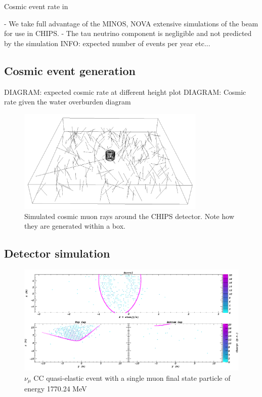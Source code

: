 Cosmic event rate in \cite{son2013}

- We take full advantage of the MINOS, NOVA extensive simulations of the \numi beam for use in
CHIPS.
- The tau neutrino component is negligible and not predicted by the simulation
INFO: expected number of events per year etc...

\subsection{Cosmic event generation} %
\label{sec:chips_monte_carlo_cosmic} %

DIAGRAM: expected cosmic rate at different height plot
DIAGRAM: Cosmic rate given the water overburden diagram

\begin{figure} %
    \includegraphics[width=0.8\textwidth]{diagrams/4-chips/cosmics.png}
    \caption[Cosmic muon rays around the CHIPS detector]
    {Simulated cosmic muon rays around the CHIPS detector. Note how they are generated within a
        box.}
    \label{fig:cosmics}
\end{figure}

\subsection{Detector simulation} %
\label{sec:chips_monte_carlo_sim} %

\begin{figure} %
    \includegraphics[width=\textwidth]{diagrams/4-chips/sim_event.png}
    \caption[sim event short]
    {$\nu_{\mu}$ CC quasi-elastic event with a single muon final state particle of energy
        1770.24 MeV}
    \label{fig:sim_event}
\end{figure}

